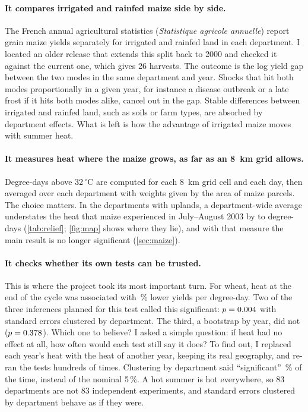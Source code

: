 \paragraph{It compares irrigated and rainfed maize side by side.} The French annual agricultural statistics (\emph{Statistique agricole annuelle}) report grain maize yields separately for irrigated and rainfed land in each department. I located an older release that extends this split back to 2000 and checked it against the current one, which gives 26 harvests. The outcome is the log yield gap between the two modes in the same department and year. Shocks that hit both modes proportionally in a given year, for instance a disease outbreak or a late frost if it hits both modes alike, cancel out in the gap. Stable differences between irrigated and rainfed land, such as soils or farm types, are absorbed by department effects. What is left is how the advantage of irrigated maize moves with summer heat.

\paragraph{It measures heat where the maize grows, as far as an 8~km grid allows.} Degree-days above 32\,$^{\circ}$C are computed for each 8~km grid cell and each day, then averaged over each department with weights given by the area of maize parcels. The choice matters. In the \ReliefCount{} departments with uplands, a department-wide average understates the heat that maize experienced in July--August 2003 by \ReliefGapSmallMin{} to \ReliefGapMax{} degree-days (\cref{tab:relief}; \cref{fig:map} shows where they lie), and with that measure the main result is no longer significant (\cref{sec:maize}).

\paragraph{It checks whether its own tests can be trusted.} This is where the project took its most important turn. For wheat, heat at the end of the cycle was associated with \WheatPct\,\% lower yields per degree-day. Two of the three inferences planned for this test called this significant: $p = 0.004$ with standard errors clustered by department. The third, a bootstrap by year, did not ($p = 0.378$). Which one to believe? I asked a simple question: if heat had no effect at all, how often would each test still say it does? To find out, I replaced each year's heat with the heat of another year, keeping its real geography, and re-ran the tests hundreds of times. Clustering by department said ``significant'' \WheatSizeDep\,\% of the time, instead of the nominal 5\,\%. A hot summer is hot everywhere, so 83 departments are not 83 independent experiments, and standard errors clustered by department behave as if they were.

